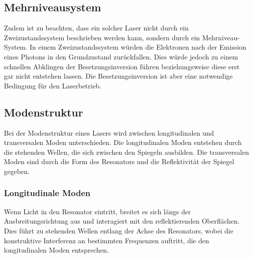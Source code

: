 \subsection{Mehrniveausystem}\label{sec:mehrniveausystem}
Zudem ist zu beachten, dass ein solcher Laser nicht durch ein Zweizustandssystem beschrieben werden kann, sondern durch ein Mehrniveau-System. In einem Zweizustandssystem würden die Elektronen
nach der Emission eines Photons in den Grundzustand zurückfallen. Dies würde jedoch zu einem schnellen Abklingen der Besetzungsinversion führen beziehungsweise diese erst gar nicht entstehen lassen. 
Die Besetzungsinversion ist aber eine notwendige Bedingung für den Laserbetrieb.\\
\subsection{Modenstruktur}\label{sec:modenstruktur}
Bei der Modenstruktur eines Lasers wird zwischen longitudinalen und transversalen Moden unterschieden. Die longitudinalen Moden entstehen durch die stehenden Wellen, die sich zwischen den Spiegeln
ausbilden. Die transversalen Moden sind durch die Form des Resonators und die Reflektivität der Spiegel gegeben.\\
\subsubsection{Longitudinale Moden}\label{sec:longitudinalemoden}
Wenn Licht in den Resonator eintritt, breitet es sich längs der Ausbreitungsrichtung aus und interagiert mit den reflektierenden Oberflächen.
Dies führt zu stehenden Wellen entlang der Achse des Resonators, wobei die konstruktive Interferenz an bestimmten Frequenzen auftritt, die den longitudinalen Moden entsprechen.
